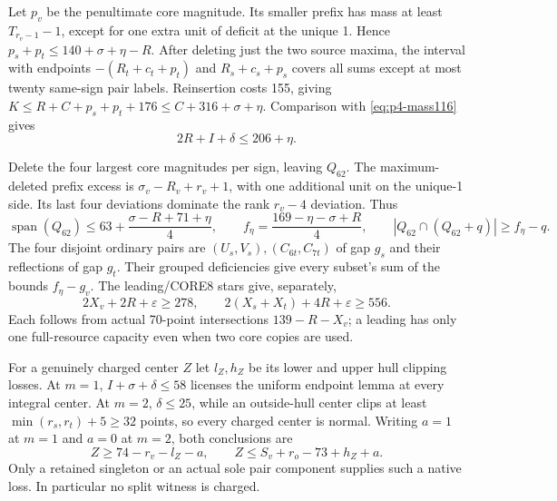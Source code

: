 \documentclass[11pt,letterpaper]{article}
\theoremstyle{definition}\newtheorem{definition}[theorem]{Definition}
\begin{document}
Let $p_v$ be the penultimate core magnitude. Its smaller prefix has mass
at least $T_{r_v-1}-1$, except for one extra unit of deficit at the unique
1. Hence $p_s+p_t\le140+\sigma+\eta-R$.
After deleting just the two source maxima, the interval with endpoints
$-(R_t+c_t+p_t)$ and $R_s+c_s+p_s$ covers all sums except at most twenty
same-sign pair labels. Reinsertion costs 155, giving
$K\le R+C+p_s+p_t+176\le C+316+\sigma+\eta$.
Comparison with \eqref{eq:p4-mass116} gives
\begin{equation}
 2R+I+\delta\le206+\eta.                          \label{eq:p4-radial}
\end{equation}

Delete the four largest core magnitudes per sign, leaving $Q_{62}$.
The maximum-deleted prefix excess is
$\sigma_v-R_v+r_v+1$, with one additional unit on the unique-1 side.
Its last four deviations dominate the rank $r_v-4$ deviation. Thus
\begin{equation}
 \operatorname{span}(Q_{62})\le63+\frac{\sigma-R+71+\eta}{4},\qquad
 f_\eta=\frac{169-\eta-\sigma+R}{4},\qquad
 |Q_{62}\cap(Q_{62}+q)|\ge f_\eta-q.              \label{eq:p4-Q62}
\end{equation}
The four disjoint ordinary pairs are
$(U_s,V_s),(C_{6t},C_{7t})$ of gap $g_s$ and their reflections of gap
$g_t$. Their grouped deficiencies give every subset's sum of the bounds
$f_\eta-g_v$. The leading/CORE8 stars give, separately,
\begin{equation}
 2X_v+2R+\varepsilon\ge278,
 \qquad 2(X_s+X_t)+4R+\varepsilon\ge556.           \label{eq:p4-stars}
\end{equation}
Each follows from actual 70-point intersections $139-R-X_v$; a leading
has only one full-resource capacity even when two core copies are used.

For a genuinely charged center $Z$ let $l_Z,h_Z$ be its lower and upper
hull clipping losses. At $m=1$, $I+\sigma+\delta\le58$ licenses the
uniform endpoint lemma at every integral center. At $m=2$,
$\delta\le25$, while an outside-hull center clips at least
$\min(r_s,r_t)+5\ge32$ points, so every charged center is normal.
Writing $a=1$ at $m=1$ and $a=0$ at $m=2$, both conclusions are
\begin{equation}
 Z\ge74-r_v-l_Z-a,
 \qquad Z\le S_v+r_o-73+h_Z+a.                    \label{eq:p4-END}
\end{equation}
Only a retained singleton or an actual sole pair component supplies
such a native loss. In particular no split witness is charged.
\end{document}

